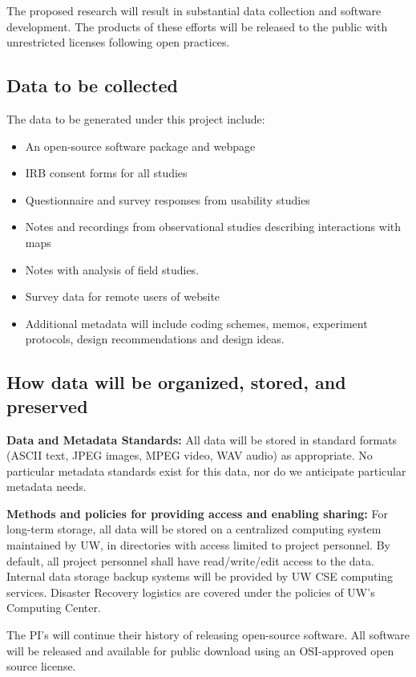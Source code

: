 The proposed research will result in substantial data collection and software development. The products of these efforts will be released to the public with unrestricted licenses following open practices. 

\subsection{Data to be collected}
The data to be generated under this project include:
\begin{itemize}
    \item An open-source software package and webpage 
    \item IRB consent forms for all studies 
    \item Questionnaire and survey responses from usability studies 
    \item Notes and recordings from observational studies describing interactions with maps
    \item Notes with analysis of field studies. 
    \item Survey data for remote users of website
    \item Additional metadata will include coding schemes, memos, experiment protocols, design recommendations and design ideas.
\end{itemize}

\subsection{How data will be organized, stored, and preserved}

\textbf{Data and Metadata Standards:} All data will be stored in standard formats (ASCII text, JPEG images, MPEG video, WAV audio) as appropriate. No particular metadata standards exist for this data, nor do we anticipate particular metadata needs. 

\textbf{Methods and policies for providing access and enabling sharing:} For long-term storage, all data will be stored on a centralized computing system maintained by UW, in directories with access limited to project personnel. By default, all project personnel shall have read/write/edit access to the data. Internal data storage backup systems will be provided by UW CSE computing services. Disaster Recovery logistics are covered under the policies of UW’s Computing Center. 

The PI's will continue their history of releasing open-source software. All software will be released and available for public download using an OSI-approved open source license. 

